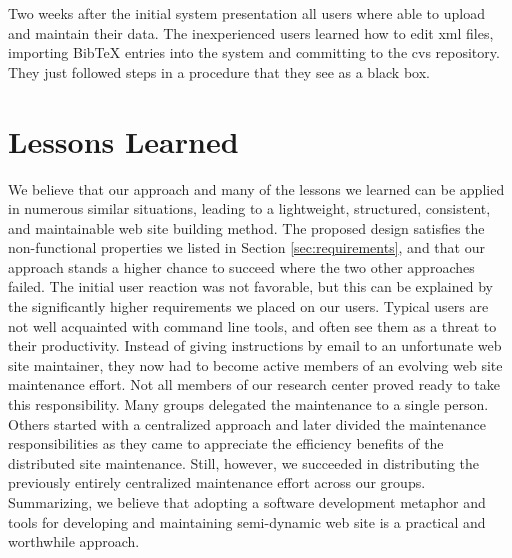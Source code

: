 \documentclass[10pt]{article}
\begin{document}
Two weeks after the initial system presentation all users where able to upload 
and maintain their data. The inexperienced users learned how to edit {\sc xml} files,
importing {\sc BibTeX} entries into the system and committing to the {\sc cvs} repository. 
They just followed steps in a procedure that they see as a black box. 

\section{Lessons Learned}
\label{sec:concl}

We believe that our approach and many of the lessons we learned
can be applied in numerous similar situations,
leading to a lightweight, structured, consistent, and maintainable
web site building method. The proposed design satisfies the non-functional properties
we listed in Section \ref{sec:requirements},
and that our approach stands a higher chance to succeed where the
two other approaches failed.
The initial user reaction was not favorable, but this can
be explained by the significantly higher requirements we
placed on our users. Typical users are not well acquainted
with command line tools, and often see them as a threat to their productivity.
Instead of giving instructions by email to an unfortunate
web site maintainer, they now had to become active members
of an evolving web site maintenance effort.
Not all members of our research center proved ready to take
this responsibility.
Many groups delegated the maintenance to a single person. 
Others started with a centralized approach and later divided the
maintenance responsibilities as they came to appreciate the efficiency
benefits of the distributed site maintenance.
Still, however, we succeeded in distributing the previously
entirely centralized maintenance effort across our groups.
Summarizing, we believe that adopting a software development
metaphor and tools for developing and maintaining semi-dynamic
web site is a practical and worthwhile approach.
\end{document}
